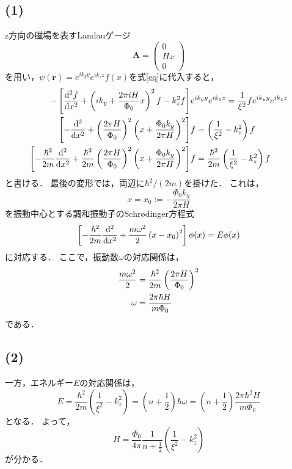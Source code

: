 \documentclass[a4paper,11pt]{jsarticle}
\begin{document}
\subsection*{(1)}
z方向の磁場を表すLandauゲージ
\begin{equation}
  \bm{A} = \left(\begin{array}{c}
     0 \\
     Hx \\
     0
  \end{array}\right)
\end{equation}
を用い，$\psi(\bm{r}) = e^{ik_yy}e^{ik_zz}f(x)$を式\eqref{eq}に代入すると，
\begin{align}
  -\left[\dv[2]{f}{x} + \left(ik_y + \frac{2\pi iH}{\Phi_0}x\right)^2f - k_z^2 f\right]&e^{ik_yy}e^{ik_zz} = \frac{1}{\xi^2}fe^{ik_yy}e^{ik_zz} \notag\\
  \left[-\dv[2]{}{x} + \left(\frac{2\pi H}{\Phi_0}\right)^2\left(x + \frac{\Phi_0k_y}{2\pi H}\right)^2\right]&f = \left(\frac{1}{\xi^2} - k_z^2\right)f \notag\\
  \left[-\frac{\hbar^2}{2m}\dv[2]{}{x} + \frac{\hbar^2}{2m}\left(\frac{2\pi H}{\Phi_0}\right)^2\left(x + \frac{\Phi_0k_y}{2\pi H}\right)^2\right]&f = \frac{\hbar^2}{2m}\left(\frac{1}{\xi^2} - k_z^2\right)f 
\end{align}
と書ける．
最後の変形では，両辺に$\hbar^2/(2m)$を掛けた．
これは，
\begin{equation}
  x = x_0 := -\frac{\Phi_0k_y}{2\pi H} \label{x0}
\end{equation}
を振動中心とする調和振動子のSchr\o dinger方程式
\begin{equation}
  \left[-\frac{\hbar^2}{2m}\dv[2]{}{x} + \frac{m\omega^2}{2}\left(x - x_0\right)^2\right]\phi(x) = E\phi(x) 
\end{equation}
に対応する．
ここで，振動数$\omega$の対応関係は，
\begin{align}
  \frac{m\omega^2}{2} &=  \frac{\hbar^2}{2m}\left(\frac{2\pi H}{\Phi_0}\right)^2 \notag\\
  \omega &= \frac{2\pi\hbar H}{m\Phi_0}
\end{align}
である．

\subsection*{(2)}
一方，エネルギー$E$の対応関係は，
\begin{equation}
  E = \frac{\hbar^2}{2m}\left(\frac{1}{\xi^2} - k_z^2\right) = \left(n+\frac{1}{2}\right)\hbar \omega = \left(n+\frac{1}{2}\right)\frac{2\pi\hbar^2 H}{m\Phi_0}
\end{equation}
となる．
よって，
\begin{equation}
  H = \frac{\Phi_0}{4\pi}\frac{1}{n+\frac{1}{2}}\left(\frac{1}{\xi^2} - k_z^2\right) \label{energy}
\end{equation}
が分かる．
\end{document}
